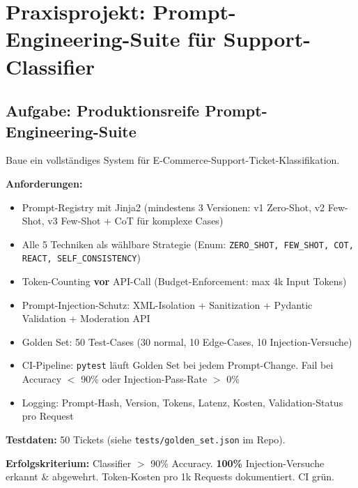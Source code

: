 \section{Praxisprojekt: Prompt-Engineering-Suite für Support-Classifier}


\subsection{Aufgabe: Produktionsreife Prompt-Engineering-Suite}

Baue ein vollständiges System für E-Commerce-Support-Ticket-Klassifikation.

\textbf{Anforderungen:}
\begin{itemize}[leftmargin=*]
    \item Prompt-Registry mit Jinja2 (mindestens 3 Versionen: v1 Zero-Shot, v2 Few-Shot, v3 Few-Shot + CoT für komplexe Cases)
    \item Alle 5 Techniken als wählbare Strategie (Enum: \texttt{ZERO\_SHOT, FEW\_SHOT, COT, REACT, SELF\_CONSISTENCY})
    \item Token-Counting \textbf{vor} API-Call (Budget-Enforcement: max 4k Input Tokens)
    \item Prompt-Injection-Schutz: XML-Isolation + Sanitization + Pydantic Validation + Moderation API
    \item Golden Set: 50 Test-Cases (30 normal, 10 Edge-Cases, 10 Injection-Versuche)
    \item CI-Pipeline: \texttt{pytest} läuft Golden Set bei jedem Prompt-Change. Fail bei Accuracy $<$ 90\% oder Injection-Pass-Rate $>$ 0\%
    \item Logging: Prompt-Hash, Version, Tokens, Latenz, Kosten, Validation-Status pro Request
\end{itemize}

\textbf{Testdaten:} 50 Tickets (siehe \texttt{tests/golden\_set.json} im Repo).

\textbf{Erfolgskriterium:} Classifier $>$ 90\% Accuracy. \textbf{100\%} Injection-Versuche erkannt \& abgewehrt. Token-Kosten pro 1k Requests dokumentiert. CI grün.


